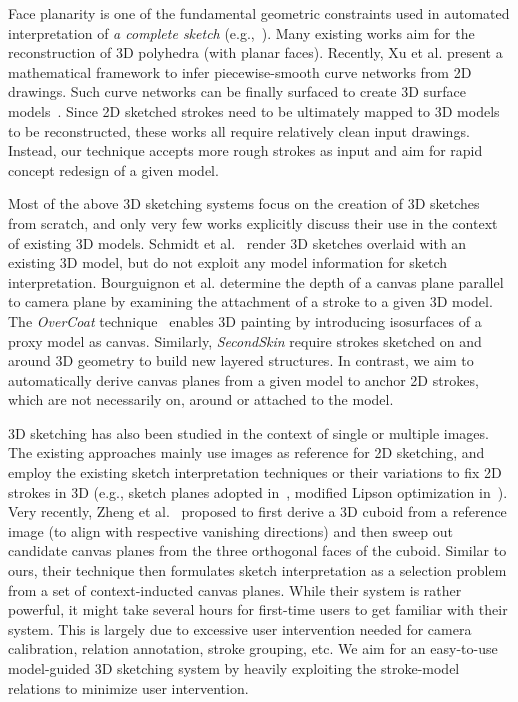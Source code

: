 Face planarity is one of the fundamental geometric constraints used in automated interpretation of \emph{a complete sketch} (e.g.,~\cite{Lipson:1996,Chen:2008f,Zou2015}). Many existing works aim for the reconstruction of 3D polyhedra (with planar faces). Recently, Xu et al.  present a mathematical framework to infer piecewise-smooth curve networks from 2D drawings. Such curve networks can be finally surfaced to create 3D surface models~\cite{Pan:2015}. Since 2D sketched strokes need to be ultimately mapped to 3D models to be reconstructed, these works all require relatively clean input drawings. Instead, our technique accepts more rough strokes as input and aim for rapid concept redesign of a given model.

Most of the above 3D sketching systems focus on the creation of 3D sketches from scratch, and only very few works explicitly discuss their use in the context of existing 3D models. Schmidt et al.~ render 3D sketches overlaid with an existing 3D model, but do not exploit any model information for sketch interpretation. Bourguignon et al. \cite{bourguignon2001drawing} determine the depth of a canvas plane parallel to camera plane by examining the attachment of a stroke to a given 3D model. The \emph{OverCoat} technique~\cite{Schmid:2011} enables 3D painting by introducing isosurfaces of a proxy model as canvas. Similarly, \emph{SecondSkin} require strokes sketched on and around 3D geometry to build new layered structures. In contrast, we aim to automatically derive canvas planes from a given model to anchor 2D strokes, which are not necessarily on, around or attached to the model. 

3D sketching has also been studied in the context of single or multiple images. The existing approaches mainly use images as reference for 2D sketching, and employ the existing sketch interpretation techniques or their variations to fix 2D strokes in 3D (e.g., sketch planes adopted in~\cite{Tsang:2004,Paczkowski:2011}, modified Lipson optimization in~\cite{Lau:2010}). Very recently, Zheng et al.~
proposed to first derive a 3D cuboid from a reference image (to align with respective vanishing directions) and then sweep out candidate canvas planes from the three orthogonal faces of the cuboid. Similar to ours, their technique then formulates sketch interpretation as a selection problem from a set of context-inducted canvas planes. While their system is rather powerful, it might take several hours for first-time users to get familiar with their system. This is largely due to excessive user intervention needed for camera calibration, relation annotation, stroke grouping, etc. We aim for an easy-to-use model-guided 3D sketching system by heavily exploiting the stroke-model relations to minimize user intervention. 

